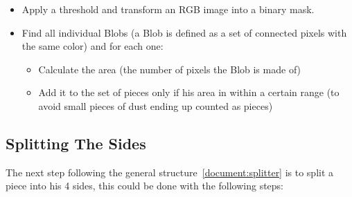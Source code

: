 \documentclass{article}
\begin{document}
\begin{itemize}
  \item Apply a threshold and transform an RGB image into a binary mask.
  \item Find all individual Blobs
  (a Blob is defined as a set of connected pixels with the same color) and for each one:

  \begin{itemize}
  \item Calculate the area (the number of pixels the Blob is made of)

  \item Add it to the set of pieces only if his area in within a certain range (to avoid small pieces of dust ending up counted as pieces)

  \end{itemize}

\end{itemize}

\subsection{Splitting The Sides}

The next step following the general structure~\ref{document:splitter}
is to split a piece into
his 4 sides, this could be done with the following steps:
\end{document}
